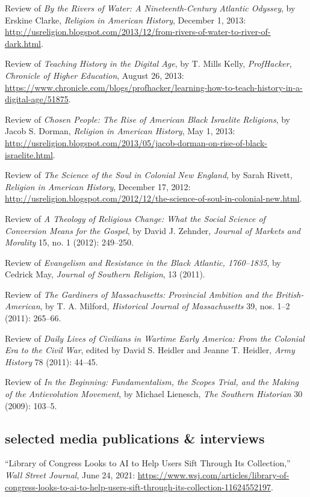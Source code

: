 \documentclass[11pt]{article}
\begin{document}
Review of \emph{By the Rivers of Water: A Nineteenth-Century Atlantic
  Odyssey}, by Erskine Clarke, \emph{Religion in American History},
December 1, 2013: 
\url{http://usreligion.blogspot.com/2013/12/from-rivers-of-water-to-river-of-dark.html}.

Review of \emph{Teaching History in the Digital Age}, by T. Mills Kelly,
\emph{ProfHacker}, \emph{Chronicle of Higher Education}, August 26,
2013: 
\url{https://www.chronicle.com/blogs/profhacker/learning-how-to-teach-history-in-a-digital-age/51875}.

Review of \emph{Chosen People: The Rise of American Black Israelite
  Religions}, by Jacob S. Dorman, \emph{Religion in American History}, May
1, 2013: 
\url{http://usreligion.blogspot.com/2013/05/jacob-dorman-on-rise-of-black-israelite.html}.

Review of \emph{The Science of the Soul in Colonial New England}, by
Sarah Rivett, \emph{Religion in American History}, December 17, 2012: 
\url{http://usreligion.blogspot.com/2012/12/the-science-of-soul-in-colonial-new.html}.

Review of \emph{A Theology of Religious Change: What the Social Science
  of Conversion Means for the Gospel}, by David J. Zehnder, \emph{Journal
  of Markets and Morality} 15, no. 1 (2012): 249--250.

Review of \emph{Evangelism and Resistance in the Black Atlantic,
  1760--1835}, by Cedrick May, \emph{Journal of Southern Religion}, 13
(2011).

Review of \emph{The Gardiners of Massachusetts: Provincial Ambition and
  the British-American}, by T. A. Milford, \emph{Historical Journal of
  Massachusetts} 39, nos. 1--2 (2011): 265--66.

Review of \emph{Daily Lives of Civilians in Wartime Early America: From
  the Colonial Era to the Civil War}, edited by David S. Heidler and
Jeanne T. Heidler, \emph{Army History} 78 (2011): 44--45.

Review of \emph{In the Beginning: Fundamentalism, the Scopes Trial, and
  the Making of the Antievolution Movement}, by Michael Lienesch,
\emph{The Southern Historian} 30 (2009): 103--5.

\subsection{selected media publications \& interviews}\label{public}

``Library of Congress Looks to AI to Help Users Sift Through Its Collection,''
\emph{Wall Street Journal}, June 24, 2021:
\url{https://www.wsj.com/articles/library-of-congress-looks-to-ai-to-help-users-sift-through-its-collection-11624552197}.
\end{document}
